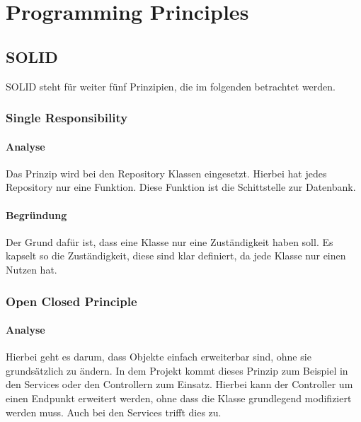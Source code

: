 
\chapter{Programming Principles}

\section{SOLID}
SOLID steht für weiter fünf Prinzipien, die im folgenden betrachtet werden.

    \subsection{Single Responsibility}
    
        \subsubsection{Analyse}
        Das Prinzip wird bei den Repository Klassen eingesetzt. Hierbei hat jedes Repository nur eine Funktion. Diese Funktion ist die Schittstelle zur Datenbank.
        
        \subsubsection{Begründung}
        Der Grund dafür ist, dass eine Klasse nur eine Zuständigkeit haben soll. Es kapselt so die Zuständigkeit, diese sind klar definiert, da jede Klasse nur einen Nutzen hat.

    \subsection{Open Closed Principle}
    
        \subsubsection{Analyse}
        Hierbei geht es darum, dass Objekte einfach erweiterbar sind, ohne sie grundsätzlich zu ändern. In dem Projekt kommt dieses Prinzip zum Beispiel in den Services oder den Controllern zum Einsatz. Hierbei kann der Controller um einen Endpunkt erweitert werden, ohne dass die Klasse grundlegend modifiziert werden muss. Auch bei den Services trifft dies zu.
        
